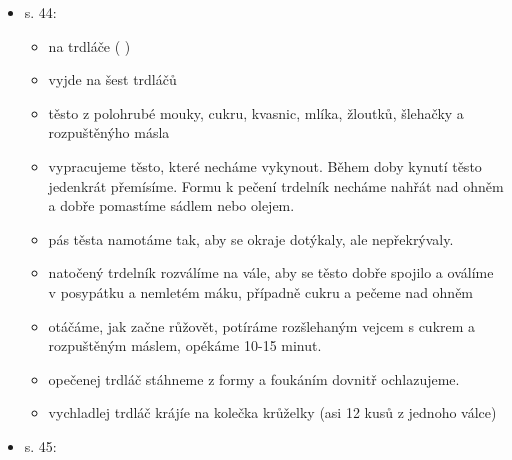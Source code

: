 \begin{itemize}
\begin{itemize}
    \begin{itemize}
    \tightlist
    \item
      období od Tří králů do popeleční středy
    \item
      koblihy a boží milosti jsou v lidové kuchyni unikátní, protože se
      připravují smažením
    \item
      V nemnohých obcích se ještě v první polovině 20. století udržela
      příprava starého typu obřadního pečiva, kterým jsou trdelníky -
      trdláče. Namotávaly se na dřevěný válec trdlo a pekly se nad
      otěvřeným ohněm. Stejně jako boží milosti se nosily jako obřadní
      pokrm šestinedělce do kúta.
    \item
      ze stejného těsta jako koblihy se smažily trubičky namotané na
      dřevěné kolíčky, paličky z klasů kukuřice nebo posléze cukrářské
      formy, byly obdobou původních trdelníků. zatímco trdláče se nijak
      neplnily, malé trubičky z koblihového těsta se plnily sněhem a
      jsou jedním z nejstačích typů cukroví
    \end{itemize}
  \item
    s. 44:

    \begin{itemize}
    \tightlist
    \item
       na trdláče ( )
    \item
      vyjde na šest trdláčů
    \item
      těsto z polohrubé mouky, cukru, kvasnic, mlíka, žloutků, šlehačky
      a rozpuštěnýho másla
    \item
      vypracujeme těsto, které necháme vykynout. Během doby kynutí těsto
      jedenkrát přemísíme. Formu k pečení trdelník necháme nahřát nad
      ohněm a dobře pomastíme sádlem nebo olejem.
    \item
      pás těsta namotáme tak, aby se okraje dotýkaly, ale nepřekrývaly.
    \item
      natočený trdelník rozválíme na vále, aby se těsto dobře spojilo a
      oválíme v posypátku a nemletém máku, případně cukru a pečeme nad
      ohněm
    \item
      otáčáme, jak začne růžovět, potíráme rozšlehaným vejcem s cukrem a
      rozpuštěným máslem, opékáme 10-15 minut.
    \item
      opečenej trdláč stáhneme z formy a foukáním dovnitř ochlazujeme.
    \item
      vychladlej trdláč krájíe na kolečka krůželky (asi 12 kusů z
      jednoho válce)
    \end{itemize}
  \item
    s. 45:


\end{itemize}
\end{itemize}
